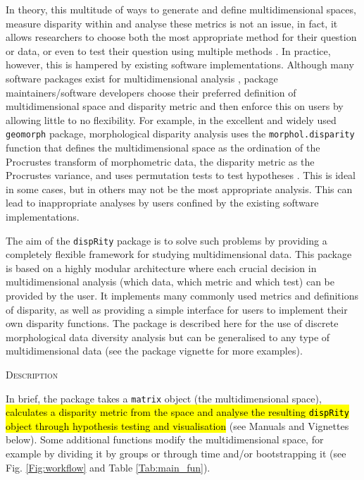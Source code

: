 \documentclass[12pt,letterpaper]{article}
\renewcommand{\section}[1]{%
\bigskip
\begin{center}
\begin{Large}
\normalfont\scshape #1
\medskip
\end{Large}
\end{center}}
\newcommand{\disp}{\texttt{dispRity} }
\begin{document}
In theory, this multitude of ways to generate and define multidimensional spaces, measure disparity within and analyse these metrics is not an issue, in fact, it allows researchers to choose both the most appropriate method for their question or data, or even to test their question using multiple methods \citep[such as][for biogeography]{matzke2013biogeobears}.
In practice, however, this is hampered by existing software implementations.
Although many software packages exist for multidimensional analysis \citep[e.g.][]{bouxin2005ginkgo,de2007ginkgo,oksanen2007vegan,adams2013geomorph,Claddis,adams2017geometric}, package maintainers/software developers choose their preferred definition of multidimensional space and disparity metric and then enforce this on users by allowing little to no flexibility.
For example, in the excellent and widely used \texttt{geomorph} package, morphological disparity analysis uses the \texttt{morphol.disparity} function that defines the multidimensional space as the ordination of the Procrustes transform of morphometric data, the disparity metric as the Procrustes variance, and uses permutation tests to test hypotheses \citep{zelditch2012geometric,adams2013geomorph,adams2017geometric}.
This is ideal in some cases, but in others may not be the most appropriate analysis.
This can lead to inappropriate analyses by users confined by the existing software implementations. %

The aim of the \disp package is to solve such problems by providing a completely flexible framework for studying multidimensional data.
This package is based on a highly modular architecture where each crucial decision in multidimensional analysis (which data, which metric and which test) can be provided by the user.
It implements many commonly used metrics and definitions of disparity, as well as providing a simple interface for users to implement their own disparity functions.
The package is described here for the use of discrete morphological data diversity analysis but can be generalised to any type of multidimensional data (see the package vignette for more examples).

\section{Description}
In brief, the package takes a \texttt{matrix} object (the multidimensional space), \hl{calculates a disparity metric from the space and analyse the resulting \texttt{dispRity} object through hypothesis testing and visualisation} (see Manuals and Vignettes below).
Some additional functions modify the multidimensional space, for example by dividing it by groups or through time and/or bootstrapping it (see Fig. \ref{Fig:workflow} and Table \ref{Tab:main_fun}).
\end{document}
